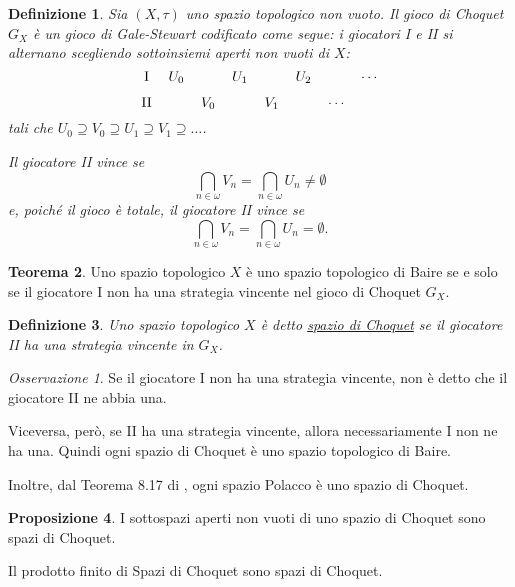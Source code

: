 \documentclass[titlepage]{article}
\newcommand{\1}{\mathds{1}}
\theoremstyle{definition}%
\newtheorem{thm}{Teorema}[section]
\newtheorem{prop}[thm]{Proposizione}
\theoremstyle{plain}
\newtheorem{defn}[thm]{Definizione}
\theoremstyle{remark}
\newtheorem*{oss}{Osservazione}
\begin{document}
\begin{defn}
Sia \((X,\tau)\) uno {spazio topologico} non vuoto. Il gioco di Choquet \(G_{X}\) è un {gioco} {di Gale-Stewart} codificato come segue: i giocatori I e II si alternano scegliendo sottoinsiemi aperti non vuoti di \(X\):
\begin{equation*}
\begin{tikzcd}[ampersand replacement=\&,cramped,sep=tiny]
	{\text{I}} \& {U_0} \&\& {U_1} \&\& {U_2} \&\& \cdots \\
	{\text{II}} \&\& {V_0} \&\& {V_1} \&\& \cdots
\end{tikzcd}
\end{equation*}
tali che \(U_{0} \supseteq V_{0}\supseteq U_{1}\supseteq V_{1}\supseteq \dots\).

Il giocatore II vince se
\begin{equation*}
\bigcap_{n \in \omega} V_{n} = \bigcap_{n \in \omega} U_{n} \neq \emptyset
\end{equation*}
e, poiché il gioco è {totale}, il giocatore II vince se
\begin{equation*}
\bigcap_{n \in \omega} V_{n} = \bigcap_{n \in \omega} U_{n} = \emptyset.
\end{equation*}
\end{defn}

\begin{thm}
Uno {spazio topologico} \(X\) è uno {spazio topologico di Baire} se e solo se il giocatore I {non ha una {strategia} {vincente}} nel {gioco di Choquet} \(G_{X}\).
\end{thm}

\begin{defn}
Uno spazio topologico \(X\) è detto \uline{spazio di Choquet} se il giocatore II ha una strategia vincente in \(G_{X}\).
\end{defn}

\begin{oss}
Se il giocatore I non ha una strategia vincente, {non è detto} che il giocatore II ne abbia una.

Viceversa, però, se II ha una strategia vincente, allora necessariamente I non ne ha una. Quindi ogni spazio di Choquet è uno spazio topologico di Baire.

Inoltre, dal Teorema 8.17 di \cite{kechris}, ogni spazio Polacco è uno spazio di Choquet.
\end{oss}

\begin{prop}
I {sottospazi} {aperti} non vuoti di uno spazio di Choquet sono spazi di Choquet.

Il {prodotto} finito di Spazi di Choquet sono spazi di Choquet.
\end{prop}
\end{document}
